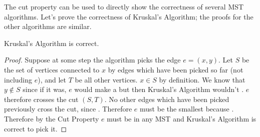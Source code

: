 \documentclass{tufte-handout}
\begin{document}
The cut property can be used to directly show the correctness of
several MST algorithms.  Let's prove the correctness of Kruskal's
Algorithm; the proofs for the other algorithms are similar.

\begin{thm}
  Kruskal's Algorithm is correct.
\end{thm}

\begin{proof}
  Suppose at some step the algorithm picks the edge $e = (x,y)$.  Let
  $S$ be the set of vertices connected to $x$ by edges which have been
  picked so far (not including $e$), and let $T$ be all other
  vertices. $x \in S$ by definition.  We know that $y \notin S$ since
  if it was, $e$ would make a  but then Kruskal's
  Algorithm wouldn't . $e$ therefore crosses
  the cut $(S,T)$. No other edges which have been picked previously
  cross the cut, since . Therefore $e$ must be the smallest
   because . Therefore by
  the Cut Property $e$ must be in any MST and Kruskal's Algorithm is
  correct to pick it.
\end{proof}
\end{document}
